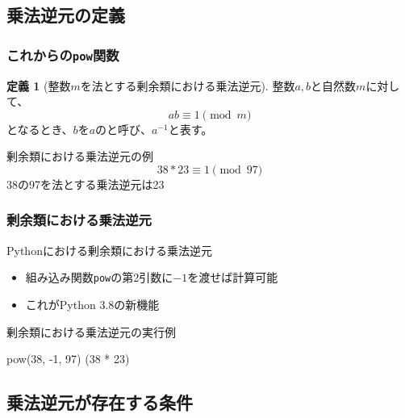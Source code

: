 \documentclass[aspectratio=169,dvipdfmx,14pt,notheorems]{beamer}
\theoremstyle{definition}
\newtheorem{definition}{定義}
\begin{document}
\subsection{乗法逆元の定義}

\begin{frame}\frametitle{これからの\texttt{pow}関数}

\begin{definition}[整数$m$を法とする剰余類における乗法逆元]
整数$a, b$と自然数$m$に対して、
\begin{equation*}
ab \equiv 1 \pmod{m}
\end{equation*}
となるとき、$b$を$a$のと呼び、$a^{-1}$と表す。
\end{definition}

\begin{exampleblock}{剰余類における乗法逆元の例}
\begin{equation*}
38 * 23 \equiv 1 \pmod{97}
\end{equation*}
38の97を法とする乗法逆元は23
\end{exampleblock}

\end{frame}

\begin{frame}[fragile]\frametitle{剰余類における乗法逆元}

\begin{block}{Pythonにおける剰余類における乗法逆元}
\begin{itemize}
\item 組み込み関数\texttt{pow}の第2引数に$-1$を渡せば計算可能
\item これがPython 3.8の新機能
\end{itemize}
\end{block}

\begin{exampleblock}{剰余類における乗法逆元の実行例}

\begin{pyconsole}
pow(38, -1, 97)
(38 * 23) %
\end{pyconsole}

\end{exampleblock}

\end{frame}

\subsection{乗法逆元が存在する条件}
\end{document}
